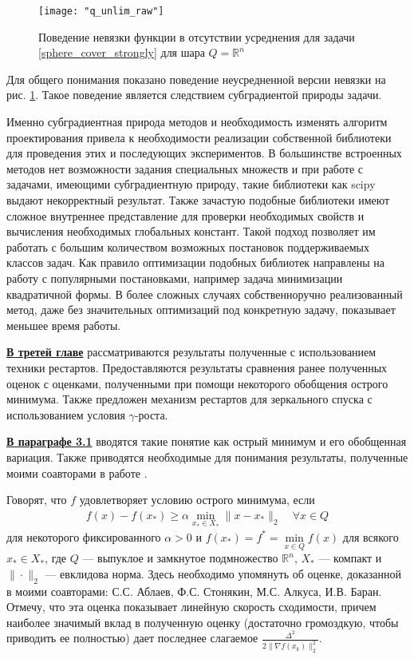 \begin{figure}[h]
	\centering
	\texttt{[image: "q\_unlim\_raw"]}
    \caption{Поведение невязки функции в отсутствии усреднения для задачи \eqref{sphere_cover_strongly} для шара $Q = \mathbb{R}^n$}
    \label{non_avg}
\end{figure}

Для общего понимания показано поведение неусредненной версии невязки на рис. \ref{non_avg}. Такое поведение является следствием субградиентой природы задачи. 

Именно субградиентная природа методов и необходимость изменять алгоритм проектирования привела к необходимости реализации собственной библиотеки для проведения этих и последующих экспериментов. В большинстве встроенных методов нет возможности задания специальных  множеств и при работе с задачами, имеющими субградиентную природу, такие библиотеки как scipy выдают некорректный результат. Также зачастую подобные библиотеки имеют сложное внутреннее представление для проверки необходимых свойств и вычисления необходимых глобальных констант. Такой подход позволяет им работать с большим количеством возможных постановок поддерживаемых классов задач. Как правило оптимизации подобных библиотек направлены на работу с популярными постановками, например задача минимизации квадратичной формы. В более сложных случаях собственноручно реализованный метод, даже без значительных оптимизаций под конкретную задачу, показывает меньшее время работы. 


\underline{\textbf{В третей главе}} рассматриваются результаты полученные с использованием техники рестартов. Предоставляются результаты сравнения ранее полученных оценок с оценками, полученными при помощи некоторого обобщения острого минимума. Также предложен механизм рестартов для зеркального спуска с использованием условия $\gamma$-роста. 

\underline{\textbf{В параграфе 3.1}} вводятся такие понятие как острый минимум и его обобщенная вариация. Также приводятся необходимые для понимания результаты, полученные моими соавторами в работе \cite{sharp22}. 

Говорят, что $f$ удовлетворяет условию острого минимума, если
\begin{gather}\label{sm}
    f(x) - f(x_*) \geq \alpha \min_{x_* \in X_*} \|x- x_*\|_2 \quad \forall x \in Q
\end{gather}
для некоторого фиксированного $\alpha >0$ и $f(x_*) = f^* = \min\limits_{x\in Q} f(x)$ для всякого $x_* \in X_*$, где $Q$ --- выпуклое и замкнутое подмножество $\mathbb{R}^n$, $X_*$ --- компакт и $\|\cdot\|_2$ --- евклидова норма. 
Здесь необходимо упомянуть об оценке, доказанной в \cite{sharp22} моими соавторами: С.С. Аблаев, Ф.С. Стонякин, М.С. Алкуса, И.В. Баран. Отмечу, что эта оценка показывает линейную скорость сходимости, причем наиболее значимый вклад в полученную оценку (достаточно громоздкую, чтобы приводить ее полностью) дает последнее слагаемое $\frac{\Delta^2}{2\|\nabla f(x_k)\|^2_2}$. 

